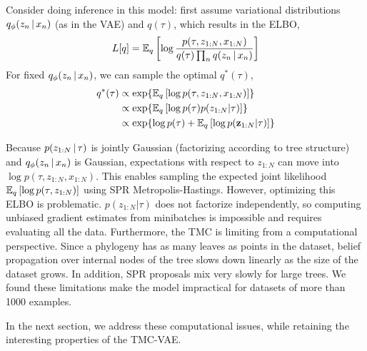 Consider doing inference in this model:
first assume variational distributions 
$q_\phi(z_n \,|\, x_n)$ (as in the VAE)
and $q(\tau)$, which results in the
ELBO,
\begin{equation}
    \begin{split}
    L[q] &= \mathbb{E}_q\left[\log \frac{p(\tau, z_{1:N}, x_{1:N})}{q(\tau)\prod_n q(z_n \,|\, x_n)}\right] \\
    \end{split}
\end{equation}
For fixed $q_\phi(z_n \,|\, x_n)$, we can
sample the optimal $q^*(\tau)$,
\begin{equation}
    \begin{split}
    q^*(\tau) &\propto \exp{\E_q\left[\log p(\tau, z_{1:N}, x_{1:N})\right]} \\
              &\propto \exp{\E_q\left[\log p(\tau)p(z_{1:N}|\tau)\right]} \\
              &\propto \exp{\log p(\tau) + \E_q\left[\log p(\latentdata|\tau)\right]}
    \end{split}
\end{equation}
\begin{equation}
    \begin{split}
    \end{split}
\end{equation}
Because $p(z_{1:N} \,|\, \tau)$ is jointly Gaussian (factorizing
according to tree structure) and $q_\phi(z_n \,|\, x_n)$ is Gaussian, 
expectations with respect to $z_{1:N}$
can move into $\log p(\tau, z_{1:N}, x_{1:N})$. This
enables sampling the expected joint likelihood $\mathbb{E}_q\left[\log p(\tau, z_{1:N})\right]$
using SPR Metropolis-Hastings.
However, optimizing this ELBO is problematic.
$p(z_{1:N} | \tau)$
does not factorize independently, so computing
unbiased gradient estimates from minibatches is impossible
and requires evaluating all the data.
Furthermore, the TMC is limiting
from a computational perspective.
Since a phylogeny has as many leaves
as points in the dataset, 
belief propagation over internal nodes
of the tree slows down linearly as 
the size of the dataset grows.
In addition,
SPR proposals mix very slowly for large trees.
We found these limitations 
make the model impractical for datasets
of more than 1000 examples.

In the next section, we address these computational
issues, while retaining
the interesting properties of the TMC-VAE.

